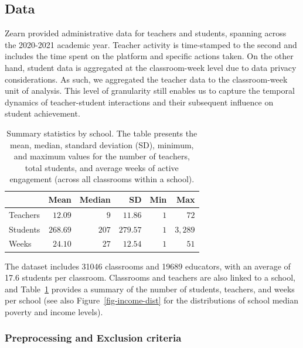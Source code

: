 \documentclass[
  number,
  preprint,
  3p,
  onecolumn]{elsarticle}
\begin{document}
\subsection{Data}\label{data}

Zearn provided administrative data for teachers and students, spanning
across the 2020-2021 academic year. Teacher activity is time-stamped to
the second and includes the time spent on the platform and specific
actions taken. On the other hand, student data is aggregated at the
classroom-week level due to data privacy considerations. As such, we
aggregated the teacher data to the classroom-week unit of analysis. This
level of granularity still enables us to capture the temporal dynamics
of teacher-student interactions and their subsequent influence on
student achievement.

\begin{longtable}{l|rrrrr}

\caption{\label{tbl-summary}Summary statistics by school. The table
presents the mean, median, standard deviation (SD), minimum, and maximum
values for the number of teachers, total students, and average weeks of
active engagement (across all classrooms within a school).}

\tabularnewline

\toprule
\multicolumn{1}{l}{} & Mean & Median & SD & Min & Max \\ 
\midrule\addlinespace[2.5pt]
Teachers & $12.09$ & $9$ & $11.86$ & $1$ & $72$ \\ 
Students & $268.69$ & $207$ & $279.57$ & $1$ & $3,289$ \\ 
Weeks & $24.10$ & $27$ & $12.54$ & $1$ & $51$ \\ 
\bottomrule

\end{longtable}

The dataset includes 31046 classrooms and 19689 educators, with an
average of 17.6 students per classroom. Classrooms and teachers are also
linked to a school, and Table~\ref{tbl-summary} provides a summary of
the number of students, teachers, and weeks per school (see also
Figure~\ref{fig-income-dist} for the distributions of school median
poverty and income levels).

\subsubsection{Preprocessing and Exclusion
criteria}\label{preprocessing-and-exclusion-criteria}
\end{document}
